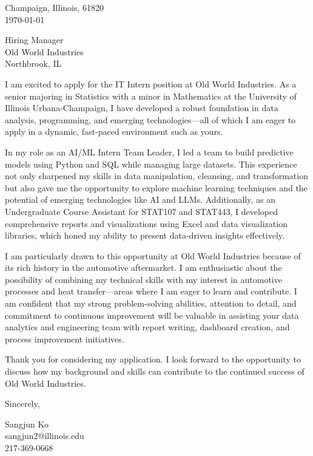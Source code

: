 \documentclass[11pt]{article}
\begin{document}
\noindent
Champaign, Illinois, 61820 \\
\today
\vspace{2em}

\noindent
Hiring Manager\\
Old World Industries\\
Northbrook, IL

\vspace{1.5em}
I am excited to apply for the IT Intern position at Old World Industries. As a senior majoring in Statistics with a minor in Mathematics at the University of Illinois Urbana-Champaign, I have developed a robust foundation in data analysis, programming, and emerging technologies—all of which I am eager to apply in a dynamic, fast-paced environment such as yours.

In my role as an AI/ML Intern Team Leader, I led a team to build predictive models using Python and SQL while managing large datasets. This experience not only sharpened my skills in data manipulation, cleansing, and transformation but also gave me the opportunity to explore machine learning techniques and the potential of emerging technologies like AI and LLMs. Additionally, as an Undergraduate Course Assistant for STAT107 and STAT443, I developed comprehensive reports and visualizations using Excel and data visualization libraries, which honed my ability to present data-driven insights effectively.

I am particularly drawn to this opportunity at Old World Industries because of its rich history in the automotive aftermarket. I am enthusiastic about the possibility of combining my technical skills with my interest in automotive processes and heat transfer—areas where I am eager to learn and contribute. I am confident that my strong problem-solving abilities, attention to detail, and commitment to continuous improvement will be valuable in assisting your data analytics and engineering team with report writing, dashboard creation, and process improvement initiatives.

Thank you for considering my application. I look forward to the opportunity to discuss how my background and skills can contribute to the continued success of Old World Industries.
\vspace{1em}

Sincerely,

\vspace{2em}

\noindent
Sangjun Ko\\
sangjun2@illinois.edu\\
217-369-0668
\end{document}
